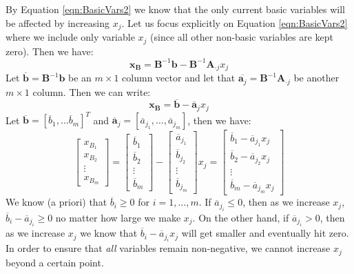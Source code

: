 By Equation \ref{eqn:BasicVars2} we know that the only current basic variables will be affected by increasing $x_j$. Let us focus explicitly on Equation \ref{eqn:BasicVars2} where we include only variable $x_j$ (since all other non-basic variables are kept zero). Then we have:
\begin{equation}
\mathbf{x_B} = \mathbf{B}^{-1}\mathbf{b} - \mathbf{B}^{-1}\mathbf{A}_{\cdot j}x_j
\label{eqn:BasicSolnXj}
\end{equation}
Let $\overline{\mathbf{b}} = \mathbf{B}^{-1}\mathbf{b}$ be an $m \times 1$ column vector and let that $\overline{\mathbf{a}_j} = \mathbf{B}^{-1}\mathbf{A}_{\cdot j}$ be another $m \times 1$ column. Then we can write:
\begin{equation}
\mathbf{x_B} = \overline{\mathbf{b}} - \overline{\mathbf{a}}_j x_j
\end{equation}
Let $\overline{\mathbf{b}} = [\overline{b}_1,\dots\overline{b}_m]^T$ and 
$\overline{\mathbf{a}}_j = [\overline{a}_{j_1},\dots,\overline{a}_{j_m}]$, then we have:
\begin{equation}
\begin{bmatrix}
x_{B_1}\\
x_{B_2}\\
\vdots\\
x_{B_m}
\end{bmatrix} = 
\begin{bmatrix}
\overline{b}_1\\
\overline{b}_2\\
\vdots\\
\overline{b}_m
\end{bmatrix} - 
\begin{bmatrix}
\overline{a}_{j_1}\\
\overline{b}_{j_2}\\
\vdots\\
\overline{b}_{j_m}
\end{bmatrix}x_j = 
\begin{bmatrix}
\overline{b}_1 - \overline{a}_{j_1}x_j\\
\overline{b}_2 - \overline{a}_{j_2}x_j\\
\vdots\\
\overline{b}_m - \overline{a}_{j_m}x_j
\end{bmatrix} 
\end{equation}
We know (a priori) that $\overline{b}_i \geq 0$ for $i=1,\dots,m$. If $\overline{a}_{j_i} \leq 0$, then as we increase $x_j$, $\overline{b}_i - \overline{a}_{j_i} \geq 0$ no matter how large we make $x_j$. On the other hand, if $\overline{a}_{j_i} > 0$, then as we increase $x_j$ we know that $\overline{b}_i - \overline{a}_{j_i}x_j$ will get smaller and eventually hit zero. In order to ensure that \textit{all} variables remain non-negative, we cannot increase $x_j$ beyond a certain point. 

